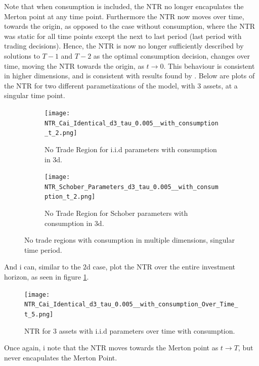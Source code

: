 \documentclass[11pt]{article}
\begin{document}
Note that when consumption is included, the \ac{NTR} no longer encapulates the Merton point at any time point.
Furthermore the \ac{NTR} now moves over time, towards the origin, as opposed to the case without consumption,
where the \ac{NTR} was static for all time points except the next to last period (last period with trading decisions).
Hence, the \ac{NTR} is now no longer sufficiently described by solutions to $T-1$ and $T-2$ as the optimal consumption decision,
changes over time, moving the NTR towards the origin, as $t \rightarrow 0$. 
This behaviour is consistent in higher dimensions, and is consistent with results found by \autocite{Scheidegger2023}.
Below are plots of the NTR for two different parametizations of the model, with $3$ assets, at a singular time point.
\begin{figure}[!ht]
    \centering
    \begin{subfigure}[t]{0.48\textwidth}
        \centering
        \texttt{[image: NTR\_Cai\_Identical\_d3\_tau\_0.005\_\_with\_consumption\_t\_2.png]}
        \caption{No Trade Region for i.i.d parameters with consumption in 3d.}
    \end{subfigure}%
    \hfill
    \begin{subfigure}[t]{0.48\textwidth}
        \centering
        \texttt{[image: NTR\_Schober\_Parameters\_d3\_tau\_0.005\_\_with\_consumption\_t\_2.png]}
        \caption{No Trade Region for Schober parameters with consumption in 3d.}
    \end{subfigure}
    \caption{No trade regions with consumption in multiple dimensions, singular time period.}
\end{figure}
And i can, similar to the $2$d case, plot the \ac{NTR} over the entire investment horizon, as seen in figure \ref{fig: NTR_3d_iid_with_consumption_over_time}.
\begin{figure}[!ht]
    \centering
    \texttt{[image: NTR\_Cai\_Identical\_d3\_tau\_0.005\_\_with\_consumption\_Over\_Time\_t\_5.png]}
    \caption{NTR for $3$ assets with i.i.d parameters over time with consumption.}
    \label{fig: NTR_3d_iid_with_consumption_over_time}
\end{figure}
Once again, i note that the NTR moves towards the Merton point as $t \rightarrow T$, but never encapulates the Merton Point. 
\end{document}
